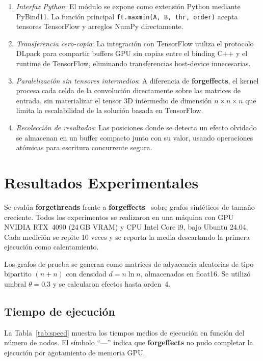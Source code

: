 \documentclass[conference]{IEEEtran}
\begin{document}
\begin{enumerate}
    \item \textit{Interfaz Python}: El módulo se expone como extensión Python mediante PyBind11. La función principal \texttt{ft.maxmin(A, B, thr, order)} acepta tensores TensorFlow y arreglos NumPy directamente.
    \item \textit{Transferencia cero-copia}: La integración con TensorFlow utiliza el protocolo DLpack para compartir buffers GPU sin copias entre el binding C++ y el runtime de TensorFlow, eliminando transferencias host-device innecesarias.
    \item \textit{Paralelización sin tensores intermedios}: A diferencia de \textbf{forgeffects}, el kernel procesa cada celda de la convolución directamente sobre las matrices de entrada, sin materializar el tensor 3D intermedio de dimensión $n \times n \times n$ que limita la escalabilidad de la solución basada en TensorFlow.
    \item \textit{Recolección de resultados}: Las posiciones donde se detecta un efecto olvidado se almacenan en un buffer compacto junto con su valor, usando operaciones atómicas para escritura concurrente segura.
\end{enumerate}

\section{Resultados Experimentales}
\label{sec:results}

Se evalúa \textbf{forgethreads} frente a \textbf{forgeffects}~\cite{claudio} sobre grafos sintéticos de tamaño creciente. Todos los experimentos se realizaron en una máquina con GPU NVIDIA RTX~4090 (24\,GB VRAM) y CPU Intel Core i9, bajo Ubuntu 24.04. Cada medición se repite 10 veces y se reporta la media descartando la primera ejecución como calentamiento.

Los grafos de prueba se generan como matrices de adyacencia aleatorias de tipo bipartito $(n{+}n)$ con densidad $d = n\ln n$, almacenadas en float16. Se utilizó umbral $\theta = 0.3$ y se calcularon efectos hasta orden~4.

\subsection{Tiempo de ejecución}

La Tabla~\ref{tab:speed} muestra los tiempos medios de ejecución en función del número de nodos. El símbolo ``---'' indica que \textbf{forgeffects} no pudo completar la ejecución por agotamiento de memoria GPU.
\end{document}
